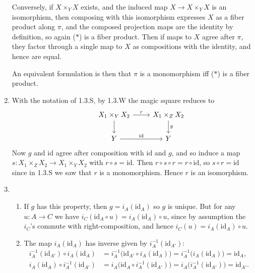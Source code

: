 \documentclass{report}
\newcommand{\id}{{\mathrm{id}}} %
\begin{document}
\begin{enumerate}[label=\textbf{1.3.\Alph*.}]
	      Conversely, if $X\times_YX$ exists, and the induced map
	      $X\to X\times_YX$ is an isomorphism, then composing with this
	      isomorphism expresses $X$ as a fiber product along $\pi$, and the
	      composed projection maps are the identity by definition, so again
	      ($*$) is a fiber product. Then if maps to $X$ agree after $\pi$,
	      they factor through a single map to $X$ as compositions with the
	      identity, and hence are equal.

	      An equivalent formulation is then that $\pi$ is a monomorphism iff
	      ($*$) is a fiber product.

	\item With the notation of 1.3.S, by 1.3.W the magic square reduces to
	      \begin{equation*}
		      \begin{tikzcd}
			      &X_1\times_YX_2 \arrow{r}{r} \arrow{d}
			      &X_1\times_ZX_2 \arrow{d}{g} \\
			      &Y \arrow{r}{\id} &Y
		      \end{tikzcd}
	      \end{equation*}
	      Now $g$ and $\id$ agree after composition with $\id$ and $g$, and so
	      induce a map $s:X_1\times_ZX_2\to X_1\times_YX_2$ with
	      $r\circ s=\id$. Then $r\circ s\circ r=r\circ\id$, so $s\circ r=\id$
	      since in 1.3.S we saw that $r$ is a monomorphism. Hence $r$ is an
	      isomorphism.

	\item
	      \begin{enumerate}[label=(\alph*)]
		      \item If $g$ has this property, then $g=i_A(\id_A)$ so $g$ is
		            unique. But for any $u:A\to C$ we have
		            $i_C(\id_A\circ u)=i_A(\id_A)\circ u$, since by assumption
		            the $i_C$'s commute with right-composition, and hence
		            $i_C(u)=i_A(\id_A)\circ u$.

		      \item The map $i_A(\id_A)$ has inverse given by $i_A^{-1}(\id_{A'})$:
		            \begin{align*}
			            i_A^{-1}(\id_{A'})\circ i_A(\id_A)
			             & = i_A^{-1}\bigl(\id_{A'}\circ i_A(\id_A)\bigr)
			            = i_A^{-1}\bigl(i_A(\id_A)\bigr)
			            = \id_A,                                          \\
			            i_A(\id_A)\circ i_A^{-1}(\id_{A'})
			             & = i_A\bigl(\id_A\circ i_A^{-1}(\id_{A'})\bigr)
			            = i_A\bigl(i_A^{-1}(\id_{A'})\bigr)
			            = \id_{A'}.
		            \end{align*}
	      \end{enumerate}


\end{enumerate}
\end{document}
